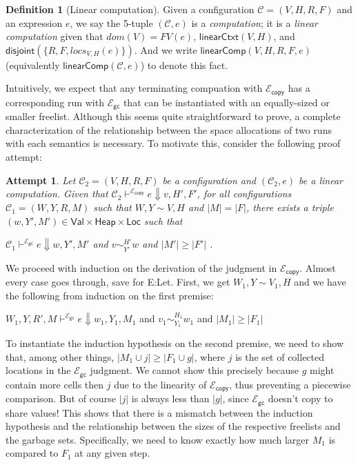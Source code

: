\documentclass{easychair}
\newcommand{\ms}[1]{\ensuremath{\mathsf{#1}}}
\newcommand{\na}[1]{\mathsf{linearCtxt}(#1)}
\newcommand{\dist}[1]{\mathsf{disjoint}(#1)}
\newcommand{\wfc}[5]{\mathsf{linearComp}(#1,#2,#3,#4,#5)}
\newcommand{\linearComp}[2]{\mathsf{linearComp}(#1,#2)}
\newcommand{\veq}[4]{#3 \sim^{#1}_{#2} #4}
\newcommand{\gcSem}{\ensuremath{\mathcal{E}_{\ms{gc}}}}
\newcommand{\copySem}{\ensuremath{\mathcal{E}_{\ms{copy}}}}
\newtheorem{attempt}{Attempt}
\theoremstyle{definition}
\newtheorem{definition}{Definition}
\begin{document}
\begin{definition}[Linear computation]
Given a configuration $\mathcal{C} = (V,H,R,F)$ and an expression $e$, 
we say the 5-tuple $(\mathcal{C},e)$ is a \emph{computation}; it is a \emph{linear computation} 
given that  $dom(V) = FV(e)$, $\na{V,H}$, and $\dist{\{R,F,locs_{V,H}(e)\}}$.
And we write $\wfc{V}{H}{R}{F}{e}$ (equivalently $\linearComp{\mathcal{C}}{e}$) to denote this fact.
\end{definition}

Intuitively, we expect that any terminating compuation
with \copySem{} has a corresponding run with \gcSem{} that can be instantiated with 
an equally-sized or smaller freelist. Although this seems quite straightforward to prove, a complete
characterization of the relationship between the space allocations of two runs with each 
semantics is necessary. To motivate this, consider the following proof attempt: 

\begin{attempt}
	Let $\mathcal{C}_2 = (V,H,R,F)$ be a configuration and $(\mathcal{C}_2, e)$ 
	be a linear computation. Given that 
	$\mathcal{C}_2 \vdash^{\copySem} e \Downarrow v,H',F'$, 
	for all configurations $\mathcal{C}_1 = (W,Y,R,M)$ such that $W,Y \sim V,H$ and $|M| = |F|$,
there exists a triple
$(w,Y',M') \in \ms{Val} \times \ms{Heap} \times \ms{Loc}$ such that
	\begin{center}
			$\mathcal{C}_1 \vdash^{\gcSem} e \Downarrow w,Y',M'$
		\hspace{3em} and \hspace{3em}	 $\veq{H'}{Y'}{v}{w}$
		\hspace{3em} and \hspace{3em}	 $|M'| \ge |F'|$ .
	\end{center}
\end{attempt}

We proceed with induction on the derivation of the judgment in \copySem. 
Almost every case goes through, save for E:Let. 
First, we get $W_1,Y \sim V_1,H$ and we have the following from induction on the first premise:
%
\begin{center}
	 $W_1,Y,R',M \vdash^{\gcSem} e \Downarrow w_1,Y_1,M_1$
   \hspace{3em} and \hspace{3em}	 $\veq{H_1}{Y_1}{v_1}{w_1}$
   \hspace{3em} and \hspace{3em}	 $|M_1| \ge |F_1|$
\end{center}
%
To instantiate the induction hypothesis on the second premise, we need to show that, among 
other things, $|M_1 \cup j| \ge |F_1 \cup g|$, where $j$ is the set of collected locations in 
the \gcSem{} judgment. We cannot show this precisely because $g$ might contain more cells 
then $j$ due to the linearity of \copySem{}, thus preventing a piecewise comparison. 
But of course $|j|$ is always less than $|g|$, since \gcSem{} doesn't copy to share 
values! This shows that there is a mismatch between the induction hypothesis and the relationship
between the sizes of the respective freelists and the garbage sets. Specifically, we need to
know exactly how much larger $M_1$ is compared to $F_1$ at any given step. 
\end{document}
